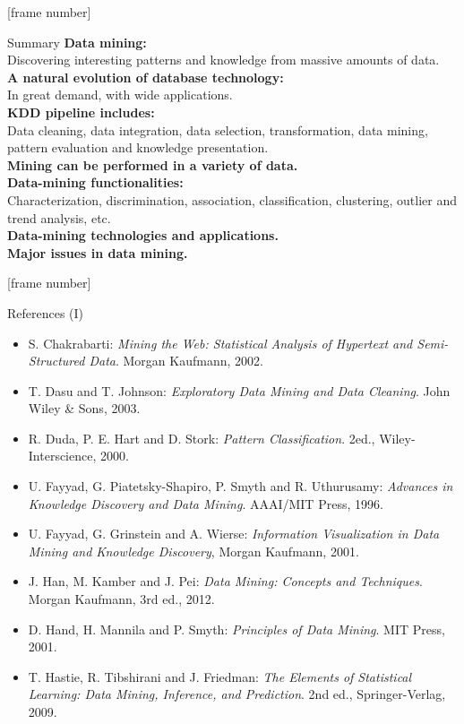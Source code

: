 \documentclass[aspectratio=169,t]{beamer}
\begin{document}
 {
    [frame number]
    \begin{frame}{Summary}
    \textbf{Data mining:}\\
    Discovering interesting patterns and knowledge from massive amounts of data.\\[0.2cm]

    \textbf{A natural evolution of database technology:}\\
    In great demand, with wide applications.\\[0.2cm]

    \textbf{KDD pipeline includes:}\\
    Data cleaning, data integration, data selection, transformation, data mining, pattern evaluation and knowledge presentation.\\[0.2cm]

    \textbf{Mining can be performed in a variety of data.}\\
    \textbf{Data-mining functionalities:}\\
    Characterization, discrimination, association, classification, clustering, outlier and trend analysis, etc.\\[0.2cm]

    \textbf{Data-mining technologies and applications.}\\
    \textbf{Major issues in data mining.}\\
    \end{frame}
  }


  {
    [frame number]
    \begin{frame}{References (I)}
        \begin{itemize}
          \item S. Chakrabarti: \emph{Mining the Web: Statistical Analysis of Hypertext and Semi-Structured Data}. Morgan Kaufmann, 2002.
          \item T. Dasu and T. Johnson: \emph{Exploratory Data Mining and Data Cleaning}. John Wiley \& Sons, 2003.
          \item R. Duda, P. E. Hart and D. Stork: \emph{Pattern Classification}. 2ed., Wiley-Interscience, 2000.
          \item U. Fayyad, G. Piatetsky-Shapiro, P. Smyth and R. Uthurusamy: \emph{Advances in Knowledge Discovery and Data Mining}. AAAI/MIT Press, 1996.
          \item U. Fayyad, G. Grinstein and A. Wierse: \emph{Information Visualization in Data Mining and Knowledge Discovery}, Morgan Kaufmann, 2001.
          \item J. Han, M. Kamber and J. Pei: \emph{Data Mining: Concepts and Techniques}. Morgan Kaufmann, 3rd ed., 2012.
          \item D. Hand, H. Mannila and P. Smyth: \emph{Principles of Data Mining}. MIT Press, 2001.
          \item T. Hastie, R. Tibshirani and J. Friedman: \emph{The Elements of Statistical Learning: Data Mining, Inference, and Prediction}. 2nd ed., Springer-Verlag, 2009.
        \end{itemize}
    \end{frame}
  }
\end{document}
